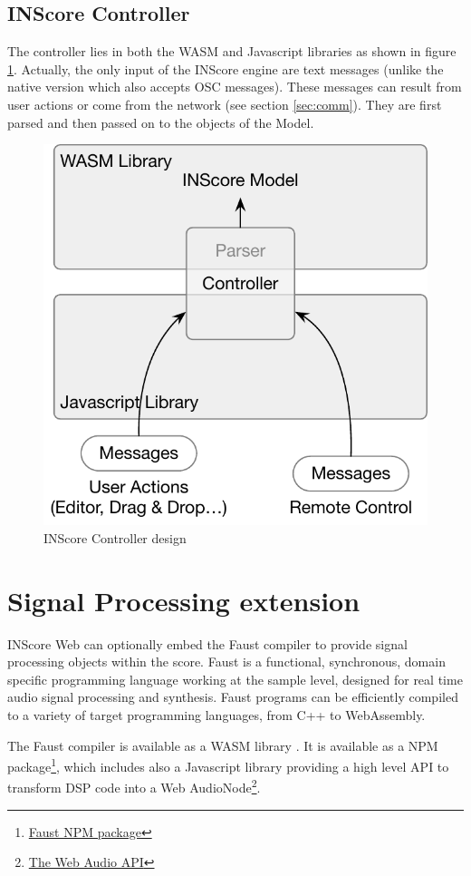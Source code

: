\documentclass{article}
\begin{document}
\subsection{INScore Controller}

The controller lies in both the WASM and Javascript libraries as shown in figure \ref{fig:ctrl}. Actually, the only input of the INScore engine are text messages (unlike the native version which also accepts OSC messages). These messages can result from user actions or come from the network (see section \ref{sec:comm}). They are first parsed and then passed on to the objects of the Model.
\begin{figure}[H]
\centering
\includegraphics[width=0.7\columnwidth]{rsrc/controller.pdf}
\caption{INScore Controller design}
\label{fig:ctrl}
\end{figure}


\section{Signal Processing extension}\label{sec:faust}

INScore Web can optionally embed the Faust compiler to provide signal processing objects within the score. 
Faust \cite{orlarey:hal-02159014} is a functional, synchronous, domain specific programming language working at the sample level, designed for real time audio signal processing and synthesis. Faust programs can be efficiently compiled to a variety of target programming languages, from C++ to WebAssembly. 

The Faust compiler is available as a WASM library \cite{letz:hal-02158925}. It is available as a NPM package\footnote{\href{https://www.npmjs.com/package/@grame/libfaust}{Faust NPM package}}, which includes also a Javascript library providing a high level API to transform DSP code into a Web AudioNode\footnote{\href{https://developer.mozilla.org/en-US/docs/Web/API/Web_Audio_API}{The Web Audio API}}.
\end{document}

